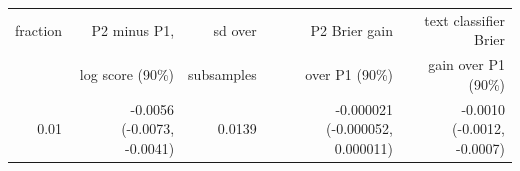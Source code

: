 \begin{tabular}{rrrrr}
\toprule
fraction & P2 minus P1, & sd over & P2 Brier gain & text classifier Brier \\
 & log score (90\%) & subsamples & over P1 (90\%) & gain over P1 (90\%) \\
\midrule
0.01 & -0.0056 (-0.0073, -0.0041) & 0.0139 & -0.000021 (-0.000052, 0.000011) & -0.0010 (-0.0012, -0.0007) \\

\end{tabular}
